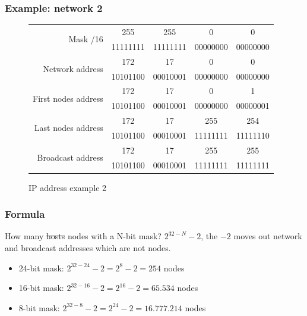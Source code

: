   \begin{frame}
    \frametitle{Example: network 2}
    \begin{figure}
        \centering
      \begin{tabular}{|r|cccc|}
        \hline
        \multirow{2}{*}{Mask /16} & {\color{brown}255} & {\color{brown}255} & {\color{brown}0} & {\color{brown}0} \\
        & {\color{brown}11111111} & {\color{brown}11111111} & {\color{brown}00000000} & {\color{brown}00000000} \\ \hline
        \multirow{2}{*}{Network address} & \color{brown}172 & \color{brown}17 & \color{blue}0 & \color{blue}0 \\
        & \color{brown}10101100 & \color{brown}00010001 & \color{blue}00000000 & \color{blue}00000000 \\ \hline
        \multirow{2}{*}{First nodes address} & \color{brown}172 & \color{brown}17 & \color{blue}0 & \color{blue}1 \\
        & \color{brown}10101100 & \color{brown}00010001 & \color{blue}00000000 & \color{blue}00000001 \\ \hline
        \multirow{2}{*}{Last nodes address} & \color{brown}172 & \color{brown}17 & \color{blue}255 & \color{blue}254 \\
        & \color{brown}10101100 & \color{brown}00010001 & \color{blue}11111111 & \color{blue}11111110 \\ \hline
        \multirow{2}{*}{Broadcast address} & \color{brown}172 & \color{brown}17 & \color{blue}255 & \color{blue}255 \\
        & \color{brown}10101100 & \color{brown}00010001 & \color{blue}11111111 & \color{blue}11111111 \\ \hline
      \end{tabular}
      \caption{IP address example 2}
    \end{figure}
  \end{frame}

  \begin{frame}
    \frametitle{Formula}
    \begin{block}{How many \sout{hosts} nodes with a N-bit mask?}
      $2^{32-N}-2$\pause, the $-2$ moves out network and broadcast addresses which are not nodes.\pause
      \begin{itemize}
        \item 24-bit mask: $2^{32-24}-2 = 2^{8}-2 = 254$ nodes \pause
        \item 16-bit mask: $2^{32-16}-2 = 2^{16}-2 = 65.534$ nodes \pause
        \item 8-bit mask: $2^{32-8}-2 = 2^{24}-2 = 16.777.214$ nodes
      \end{itemize}
    \end{block}
  \end{frame}

